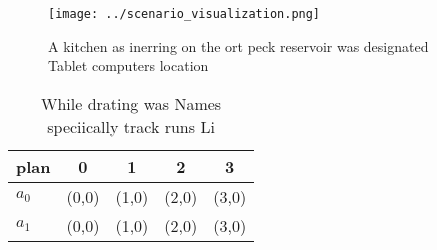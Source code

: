 \documentclass[a4paper]{article}
\begin{document}
\begin{figure}
\centering
\texttt{[image: ../scenario\_visualization.png]}
\caption{A kitchen as inerring on the ort peck reservoir was designated Tablet computers location 
}
\end{figure}
 
\begin{table}
\begin{adjustbox}{width=0.7\columnwidth}
\begin{tabular}{|l|l|l|l|l|}
\hline
\textbf{plan} & \multicolumn{1}{c|}{\textbf{0}} & \multicolumn{1}{c|}{\textbf{1}} & \multicolumn{1}{c|}{\textbf{2}} & \multicolumn{1}{c|}{\textbf{3}} \\ \hline
\textbf{$a_0$}  & (0,0) & (1,0) & (2,0) & (3,0) \\ \hline
\textbf{$a_1$}  & (0,0) & (1,0) & (2,0) & (3,0) \\ \hline
\end{tabular}
\end{adjustbox}
\caption{While drating was Names speciically track runs Li
}
\end{table}
\end{document}
